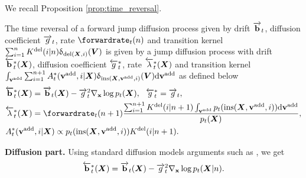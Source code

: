 We recall Proposition \ref{prop:time_reversal}.

\setcounter{proposition}{0}
\begin{proposition}
The time reversal of a forward jump diffusion process given by drift $\overrightarrow{\mathbf{b}}_t$,
diffusion coefficient $\overrightarrow{g}_t$, 
rate $\forwardrate_t(n)$ and
transition kernel $\sum_{i=1}^n
K^{\textup{del}}(i | n)
\updelta_{
\textup{del}({\bm{X}}, i)
}({\bm{V}})$ 
is given by
a jump diffusion process with drift $\overleftarrow{\mathbf{b}}_t^*({\bm{X}})$, 
diffusion coefficient $\overleftarrow{g}_t^*$, rate $\overleftarrow{\lambda}_t^*({\bm{X}})$ and transition kernel $\int_{{\mathbf{v}}^{\textup{add}}} \sum_{i=1}^{n+1}  A^*_t({\mathbf{v}}^{\textup{add}}, i | {\bm{X}}) \updelta_{\textup{ins}({\bm{X}}, {\mathbf{v}}^{\textup{add}}, i)}({\bm{V}}) \mathrm{d} {\mathbf{v}}^{\textup{add}}$ as defined below
\begin{align}
    &\backwarddrift_{t}^*(\mX) = \forwarddrift_{t}(\mX) - \forwarddiffcoeff_t^2 \nabla_{\rvx} \log p_{t}(\mX),~~\backwarddiffcoeff_{t}^* = \forwarddiffcoeff_{t},\\
    & \backwardrate_{t}^*(\mX) = \forwardrate_{t}(n+1) \frac{ \sum_{i=1}^{n+1} \delidxdist(i | n+1) \int_{\yadd} p_{t}( \textup{ins}(\mX, \yadd, i)) \rmd \yadd }{p_{t}(\mX)},\\
    & \autonet_{t}^*( \yadd, i | \mX) \propto p_{t}(\textup{ins}(\mX, \yadd, i) ) \delidxdist(i| n+1).
\end{align}
\end{proposition}





\textbf{Diffusion part. } Using standard diffusion models arguments such as
\citet{anderson1982reverse,conforti2022time}, we get
\begin{equation}
    \overleftarrow{\mathbf{b}}_{t}^*({\bm{X}}) = \overrightarrow{\mathbf{b}}_t({\bm{X}}) - \overrightarrow{g}_t^2 \nabla_{{\mathbf{x}}} \log p_t({\bm{X}} | n) . 
\end{equation}


